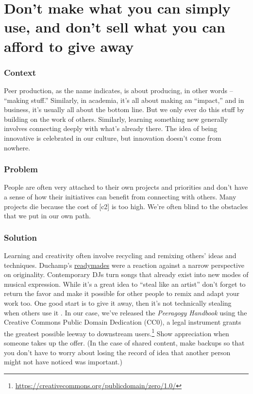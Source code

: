 \begingroup \color{BurntOrange}

\section{Don't make what you can simply use, and don't sell what you can afford to give away} \label{sec:Use_or_make}

\subsubsection*{Context}
Peer production, as the name indicates, is about producing, in other words -- ``making stuff.''  Similarly, in academia, it's all about making an ``impact,'' and in business, it's usually all about the bottom line.  But we only ever do this stuff by building on the work of others.  Similarly, learning something new generally involves connecting deeply with what's already there.  The idea of being innovative is celebrated in our culture, but innovation doesn't come from nowhere. 

\subsubsection*{Problem}
People are often very attached to their own projects and priorities and don't have a sense of how their initiatives can benefit from connecting with others. Many projects die because the cost of  [c2] is too high.  We're often blind to the obstacles that we put in our own path.

\subsubsection*{Solution} Learning and creativity often involve recycling and remixing others' ideas and techniques.   Duchamp's {\href{https://en.wikipedia.org/w/index.php?title=Readymades_of_Marcel_Duchamp&oldid=660437742}{readymades}} were a reaction against a narrow perspective on originality.  Contemporary DJs turn songs that already exist into new modes of musical expression.  While it's a great idea to ``steal like an artist'' don't forget to return the favor and make it possible for other people to remix and adapt your work too.  One good start is to give it away, then it's not technically stealing when others use it \cite{anderson2009free}. In our case, we've released the \emph{Peeragogy Handbook} using the Creative Commons Public Domain Dedication (CC0), a legal instrument grants the greatest possible leeway to downstream users.\footnote{\url{https://creativecommons.org/publicdomain/zero/1.0/}}  Show appreciation when someone takes up the offer.  (In the case of shared content, make backups so that you don't have to worry about losing the record of idea that another person might not have noticed was important.)

